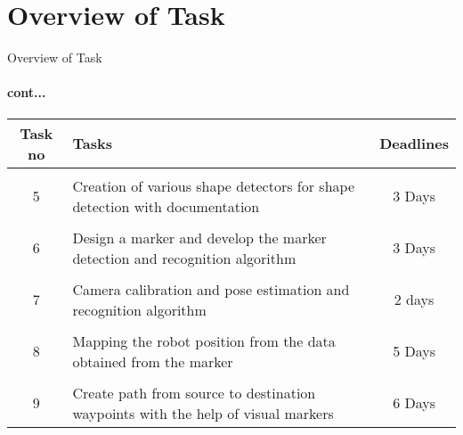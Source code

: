 \documentclass[10pt, a4paper]{beamer}
\begin{document}
\section{Overview of Task}
\begin{frame}{Overview of Task}
	\framesubtitle{cont...}
	\centering
	\begin{tabular}{ c  p{6cm}  c }
		\\
		\rowcolor{LightCyan}
		Task no & \centering Tasks & Deadlines  \\
		\hline
		\\
		\rowcolor{LightCyan}
		5 & Creation of various shape detectors for shape detection with documentation  & 3 Days \\
		\hline
		\\
		\rowcolor{LightCyan}
		6 & Design a marker and develop the marker detection and recognition algorithm & 3 Days  \\
		\hline
		\\
		\rowcolor{LightCyan}
		7 & \small{Camera calibration and pose estimation and recognition algorithm} & 2 days\\
		\hline
		\\
		\rowcolor{LightCyan}
		8 & Mapping the robot position from the data obtained from the marker& 5 Days \\
		\hline
		\\
		\rowcolor{LightCyan}
		9 & Create path from source to destination waypoints with the help of visual markers & 6 Days \\
		
		\hline
		
	\end{tabular}
\end{frame}
\end{document}
